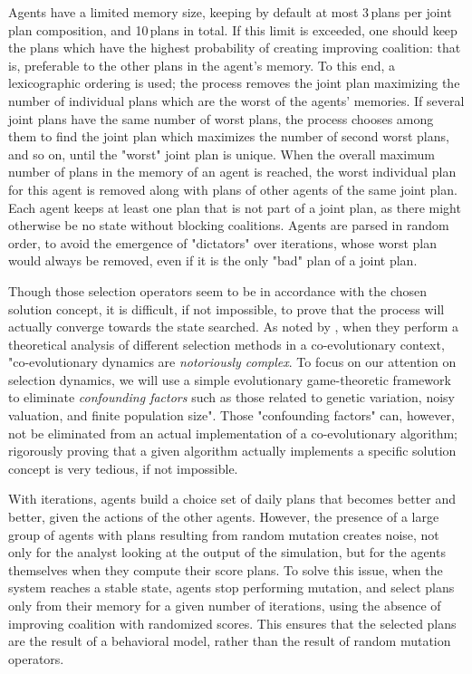 {Agents have a limited memory size, keeping by default at most 3\,plans per joint plan composition, and 10\,plans in total. If this limit is exceeded, one should keep the plans which have the highest probability of creating improving coalition: that is, preferable to the other plans in the agent's memory. To this end, a lexicographic ordering is used; the process removes the joint plan  maximizing the number of individual plans which are the worst of the agents' memories. If several joint plans have the same number of worst plans, the process chooses among them to find the joint plan which maximizes the number of second worst plans, and so on, until the "worst" joint plan is unique. When the overall maximum number of plans in the memory of an agent is reached, the worst individual plan for this agent is removed along with plans of other agents of the same joint plan. Each agent keeps at least one plan that is not part of a joint plan, as there might otherwise be no state without blocking coalitions. Agents are parsed in random order, to avoid the emergence of "dictators" over iterations, whose worst plan would always be removed, even if it is the only "bad" plan of a joint plan.

Though those selection operators seem to be in accordance with the chosen solution concept, it is difficult, if not impossible, to prove that the process will actually converge towards the state searched. As noted by \citet{FiciciEtAl_ITEC_2005}, when they perform a theoretical analysis of different selection methods in a co-evolutionary context, "co-evolutionary dynamics are \emph{notoriously complex}. To focus on our attention on selection dynamics, we will use a simple evolutionary game-theoretic framework to eliminate \emph{confounding factors} such as those related to genetic variation, noisy  valuation, and finite population size". Those "confounding factors" can, however, not be eliminated from an actual implementation of a co-evolutionary algorithm; rigorously proving that a given algorithm actually implements a specific solution concept is very tedious, if not impossible.

With iterations, agents build a choice set of daily plans that becomes better and better, given the actions of the other agents. However, the presence of a large group of agents with plans resulting from random mutation creates noise, not only for the analyst looking at the output of the simulation, but for the agents themselves when they compute their score plans. To solve this issue, when the system reaches a stable state, agents stop performing mutation, and select plans only from their memory for a given number of iterations, using the absence of improving coalition with randomized scores. This ensures that the selected plans are the result of a behavioral model, rather than the result of random mutation operators.

}
